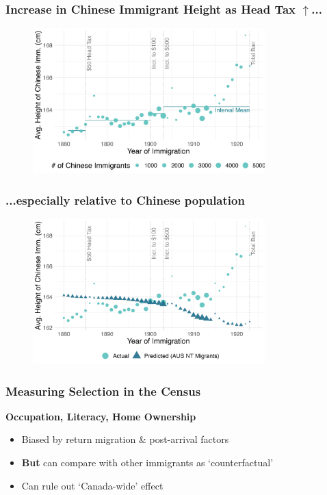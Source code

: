 \documentclass[xcolor=dvipsnames, compress, 12pt, aspectratio=169, handout]{beamer}
\begin{document}
\begin{frame}
    \frametitle{Increase in Chinese Immigrant Height as Head Tax $\uparrow$...}
    \begin{figure}
        \includegraphics[width = 0.8\textwidth]{../../figs/slides/height_selection.png}
    \end{figure}
\end{frame}

\begin{frame}
    \label{height2}
    \frametitle{...especially relative to Chinese population \hyperlink{baten_graph}{}}
    \begin{figure}
        \includegraphics[width = 0.8\textwidth]{../../figs/slides/height_compare_selection.png}
    \end{figure}
\end{frame}

\begin{frame}
    \frametitle{Measuring Selection in the Census}
    \textbf{Occupation, Literacy, Home Ownership} \vspace{2mm}
    \begin{itemize}
        \item Biased by return migration \& post-arrival factors \vspace{2mm}
        \item \textbf{But} can compare with other immigrants as `counterfactual'  \vspace{2mm}
        \item Can rule out `Canada-wide' effect 
    \end{itemize}
\end{frame}
\end{document}
